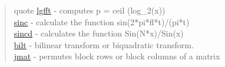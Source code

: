 \begin{quote}{quote}
\noindent
\hyperlink {lgfft}{lgfft} - computes p = ceil (log\_2(x)) \\
\hyperlink {sinc}{sinc} - calculate the function sin(2*pi*fl*t)/(pi*t) \\
\hyperlink {sincd}{sincd} - calculates the function Sin(N*x)/Sin(x) \\
\hyperlink {bilt}{bilt} - bilinear transform or biquadratic transform. \\
\hyperlink {jmat}{jmat} - permutes block rows or block columns of a matrix  
\end{quote}

% 
% 
% 
% 
% 
% 
% 
% 
% 
% 
% 
% 
% 
% 
% 
% 
% 
% 
% 
% 
% 

% 
% 
% 
% 
% 
% 
% 
% 
% 
% 
% 
% 
% 
% 
% 
% 

% 
% 

% 
% 


% 
% 
% 

% 
% 
% 
% 

% 
% 
% 
% 
% 
% 
% 
% 
% 
% 
% 
% 
% 
% 
% 

